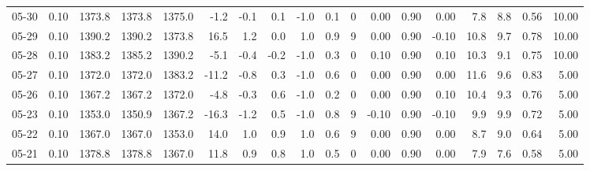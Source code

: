 \begin{threeparttable}
{\begin{tabular}{lrrrrrrrrrrrrrrrrr}
  05-30 &     0.10 & 1373.8 & 1373.8 & 1375.0 &       -1.2 &           -0.1 &                       0.1 &                     -1.0 &                 0.1 &              0 &       0.00 &      0.90 &           0.00 &              7.8 &                 8.8 &            0.56 &                  10.00 \\
  05-29 &     0.10 & 1390.2 & 1390.2 & 1373.8 &       16.5 &            1.2 &                       0.0 &                      1.0 &                 0.9 &              9 &       0.00 &      0.90 &          -0.10 &             10.8 &                 9.7 &            0.78 &                  10.00 \\
  05-28 &     0.10 & 1383.2 & 1385.2 & 1390.2 &       -5.1 &           -0.4 &                      -0.2 &                     -1.0 &                 0.3 &              0 &       0.10 &      0.90 &           0.10 &             10.3 &                 9.1 &            0.75 &                  10.00 \\
  05-27 &     0.10 & 1372.0 & 1372.0 & 1383.2 &      -11.2 &           -0.8 &                       0.3 &                     -1.0 &                 0.6 &              0 &       0.00 &      0.90 &           0.00 &             11.6 &                 9.6 &            0.83 &                   5.00 \\
  05-26 &     0.10 & 1367.2 & 1367.2 & 1372.0 &       -4.8 &           -0.3 &                       0.6 &                     -1.0 &                 0.2 &              0 &       0.00 &      0.90 &           0.10 &             10.4 &                 9.3 &            0.76 &                   5.00 \\
  05-23 &     0.10 & 1353.0 & 1350.9 & 1367.2 &      -16.3 &           -1.2 &                       0.5 &                     -1.0 &                 0.8 &              9 &      -0.10 &      0.90 &          -0.10 &              9.9 &                 9.9 &            0.72 &                   5.00 \\
  05-22 &     0.10 & 1367.0 & 1367.0 & 1353.0 &       14.0 &            1.0 &                       0.9 &                      1.0 &                 0.6 &              9 &       0.00 &      0.90 &           0.00 &              8.7 &                 9.0 &            0.64 &                   5.00 \\
  05-21 &     0.10 & 1378.8 & 1378.8 & 1367.0 &       11.8 &            0.9 &                       0.8 &                      1.0 &                 0.5 &              0 &       0.00 &      0.90 &           0.00 &              7.9 &                 7.6 &            0.58 &                   5.00 \\

\end{tabular}}
\end{threeparttable}
